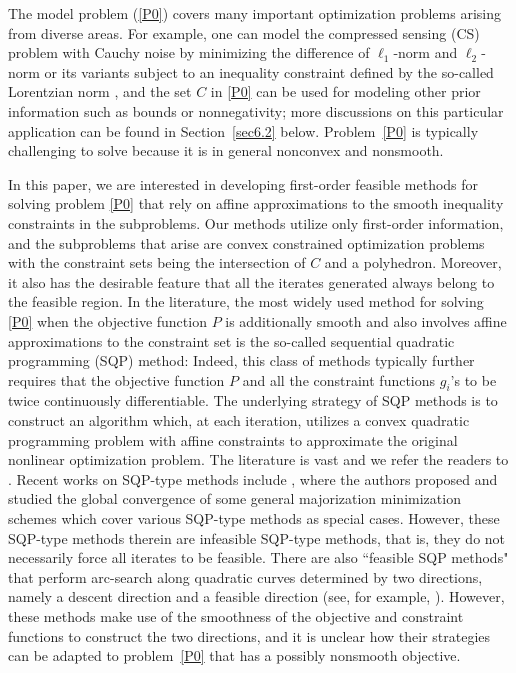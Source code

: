 \documentclass[10pt]{article}
\numberwithin{equation}{section}
\begin{document}
The model problem (\ref{P0}) covers many important optimization problems arising from diverse areas. For example, one can model the compressed sensing (CS) problem with Cauchy noise by minimizing the difference of $\ell_1$-norm and $\ell_2$-norm \cite{YiLH15} or its variants subject to an inequality constraint defined by the so-called Lorentzian norm \cite{CaBA10}, and the set $C$ in \eqref{P0} can be used for modeling other prior information such as bounds or nonnegativity; more discussions on this particular application can be found in Section~\ref{sec6.2} below. Problem~\eqref{P0} is typically challenging to solve because it is in general nonconvex and nonsmooth.%

In this paper, we are interested in developing first-order feasible methods for solving problem \eqref{P0} that rely on affine approximations to the smooth inequality constraints in the subproblems. Our methods utilize only first-order information, and the subproblems that arise are convex constrained optimization problems with the constraint sets being the intersection of $C$ and a polyhedron. %
 Moreover, it also has the desirable feature that  all the iterates generated always belong to the feasible region. In the literature, the most widely used method for solving \eqref{P0} when the objective function $P$ is additionally smooth and also involves affine approximations to the constraint set is the so-called sequential quadratic programming (SQP) method: Indeed, this class of methods typically further requires that the objective function $P$ and all the constraint functions $g_i$'s to be twice continuously differentiable. The underlying strategy of SQP methods is to construct an algorithm which, at each iteration, utilizes a convex quadratic programming problem with affine constraints to approximate the original nonlinear optimization problem. The literature is vast and we refer the readers to \cite{Ber95,NoWr06,GiWo12,FlGL02,So09,Au13,BoPau16,WrightTenny04,PaTi93,FlPa08,LawTits01}.
Recent works on SQP-type methods include \cite{Au13,BoPau16}, where the authors proposed and studied the global convergence of some general majorization minimization schemes which cover various SQP-type methods as special cases. However, these SQP-type methods therein are infeasible SQP-type methods, that is, they do not necessarily force all iterates to be feasible. There are also ``feasible SQP methods" that perform arc-search along quadratic curves determined by two directions, namely a descent direction and a feasible direction (see, for example, \cite{PaTi93,FlPa08,LawTits01}). However, these methods make use of the smoothness of the objective and constraint functions to construct the two directions, and it is unclear how their strategies can be adapted to problem~\eqref{P0} that has a possibly nonsmooth objective.
\end{document}
